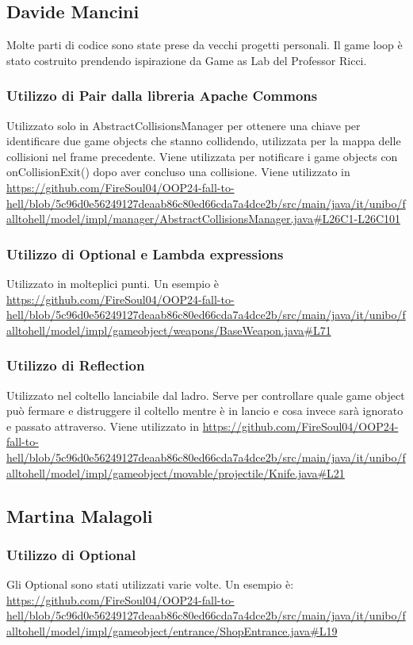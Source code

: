 \documentclass[a4paper,12pt]{report}
\begin{document}
\subsection{Davide Mancini}

Molte parti di codice sono state prese da vecchi progetti personali.
Il game loop è stato costruito prendendo ispirazione da Game as Lab del Professor Ricci.

\subsubsection{Utilizzo di Pair dalla libreria Apache Commons}
Utilizzato solo in AbstractCollisionsManager per ottenere una chiave per identificare due game objects che stanno collidendo, utilizzata per la mappa delle collisioni nel frame precedente. Viene utilizzata per notificare i game objects con onCollisionExit() dopo aver concluso una collisione. Viene utilizzato in \url{https://github.com/FireSoul04/OOP24-fall-to-hell/blob/5c96d0e56249127deaab86c80ed66cda7a4dce2b/src/main/java/it/unibo/falltohell/model/impl/manager/AbstractCollisionsManager.java#L26C1-L26C101}

\subsubsection{Utilizzo di Optional e Lambda expressions}
Utilizzato in molteplici punti. Un esempio è \url{https://github.com/FireSoul04/OOP24-fall-to-hell/blob/5c96d0e56249127deaab86c80ed66cda7a4dce2b/src/main/java/it/unibo/falltohell/model/impl/gameobject/weapons/BaseWeapon.java#L71}

\subsubsection{Utilizzo di Reflection}
Utilizzato nel coltello lanciabile dal ladro. Serve per controllare quale game object può fermare e distruggere il coltello mentre è in lancio e cosa invece sarà ignorato e passato attraverso. Viene utilizzato in \url{https://github.com/FireSoul04/OOP24-fall-to-hell/blob/5c96d0e56249127deaab86c80ed66cda7a4dce2b/src/main/java/it/unibo/falltohell/model/impl/gameobject/movable/projectile/Knife.java#L21}

\subsection{Martina Malagoli}

\subsubsection{Utilizzo di Optional}
Gli Optional sono stati utilizzati varie volte. Un esempio è:
\url{https://github.com/FireSoul04/OOP24-fall-to-hell/blob/5c96d0e56249127deaab86c80ed66cda7a4dce2b/src/main/java/it/unibo/falltohell/model/impl/gameobject/entrance/ShopEntrance.java#L19}
\end{document}
